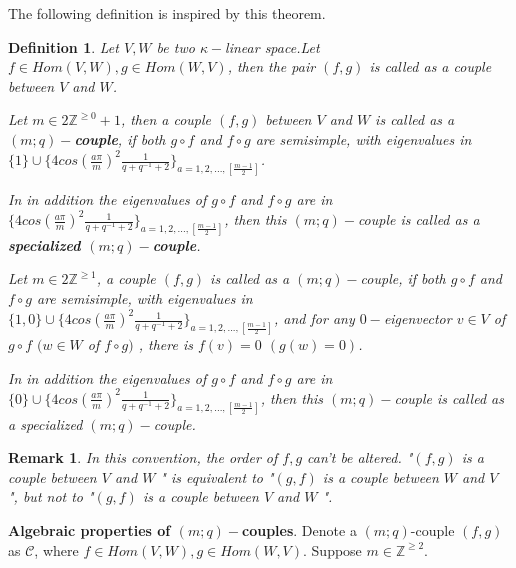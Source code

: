 \def\CTEXPreproc{Created by ctex v0.2.12, don't edit!}\documentclass[11pt]{article}
\newtheorem{defi}{Definition}[section]
\newtheorem{rem}{Remark}[section]
\begin{document}
The following definition is inspired by this theorem.

\begin{defi}
Let $V,W$ be two $\kappa-$linear space.Let $f\in Hom(V,W), g\in Hom(W,V)$, then the pair $(f,g)$ is called as a couple between $V$ and $W$.

Let $m\in 2\mathbb{Z}^{\geq 0} +1$, then a couple $(f,g)$ between $V$ and $W$ is called as a \textbf{$(m;q)-$couple}, if both $g\circ f$ and $f\circ g$ are semisimple, with eigenvalues in $\{1\}\cup \{ 4 cos(\frac{a\pi}{m})^2 \frac{1}{q+q^{-1}+2} \} _{a=1,2,...,[\frac{m-1}{2} ]}$.

In in addition the eigenvalues of $g\circ f$ and $f\circ g$ are in  $\{ 4 cos(\frac{a\pi}{m})^2 \frac{1}{q+q^{-1}+2} \} _{a=1,2,...,[\frac{m-1}{2} ]}$, then  this $(m;q)-$couple is called  as a \textbf{specialized $(m;q)-$couple}.

Let $m\in 2\mathbb{Z}^{\geq 1} $, a couple $(f,g)$ is called as a $(m; q)-$couple, if
both $g\circ f$ and $f\circ g$ are semisimple, with eigenvalues in $\{1,0 \}\cup \{ 4 cos(\frac{a\pi}{m})^2 \frac{1}{q+q^{-1}+2} \} _{a=1,2,...,[\frac{m-1}{2} ]}$, and for any $0-$eigenvector $v\in V$ of $g\circ f$  $(w\in W$ of $f\circ g )$ , there is $f(v)=0$  $(g(w)=0)$.

In in addition the eigenvalues of $g\circ f$ and $f\circ g$ are in  $\{ 0\} \cup \{ 4 cos(\frac{a\pi}{m})^2 \frac{1}{q+q^{-1}+2} \} _{a=1,2,...,[\frac{m-1}{2} ]}$, then this $(m;q)-$couple is called  as a specialized $(m;q)-$couple.


\end{defi}



\begin{rem}
 In this convention, the order of $f,g$ can't be altered. "$(f,g)$ is a couple between $V$ and $W$ " is equivalent to "$(g,f)$ is a couple between $W$ and $V$   ", but not to "$(g,f)$ is a couple between $V$ and $W$  ".
\end{rem}

\noindent\textbf{Algebraic properties of $(m;q)-$couples}. Denote a $(m;q)$-couple $(f, g)  $ as $\mathscr{C}$, where $f\in Hom(V,W), g\in Hom(W,V)$. Suppose $m\in \mathbb{Z}^{\geq 2}$.
\end{document}
